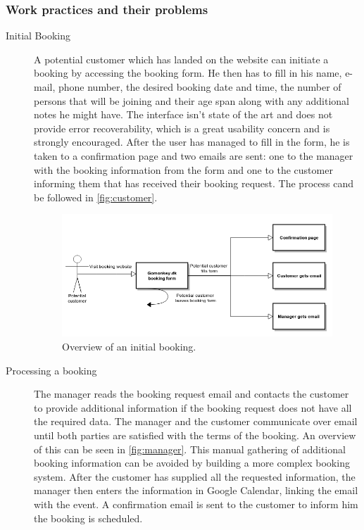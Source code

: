 \subsubsection{Work practices and their problems}

\begin{description}
\item[Initial Booking]
A potential customer which has landed on the website can initiate a booking
by accessing the booking form. He then has to fill in his name, e-mail, phone number, 
the desired booking date and time, the number of persons that will be joining and their
age span along with any additional notes he might have. The interface isn't state of the art 
and does not provide error recoverability, which is a great usability concern and is 
strongly encouraged. After the user has managed to fill in the form, he is taken to a confirmation
page and two emails are sent: one to the manager with the booking information from the form and
one to the customer informing them that \gomonkey  has received their booking request. The process
cand be followed in \autoref{fig:customer}.

\begin{figure}[htbp]
    \centering
        \includegraphics[width=\textwidth]{figures/customer.png}
            \caption{Overview of an initial booking.}
        \label{fig:customer}
\end{figure}

\item[Processing a booking]
The manager reads the booking request email and contacts the customer to provide additional
information if the booking request does not have all the required data. The manager and the 
customer communicate over email until both parties are satisfied with the terms of the booking.
An overview of this can be seen in \autoref{fig:manager}. This manual gathering of additional
booking information can be avoided by building a more complex booking system. After the customer
has supplied all the requested information, the manager then enters the information in Google
Calendar, linking the email with the event. A confirmation email is sent to the customer to
inform him the booking is scheduled.


\end{description}
